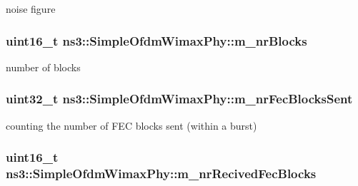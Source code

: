 noise figure 

\subsubsection[{\texorpdfstring{m\+\_\+nr\+Blocks}{m_nrBlocks}}]{\setlength{\rightskip}{0pt plus 5cm}uint16\+\_\+t ns3\+::\+Simple\+Ofdm\+Wimax\+Phy\+::m\+\_\+nr\+Blocks\hspace{0.3cm}{\ttfamily [private]}}\hypertarget{classns3_1_1SimpleOfdmWimaxPhy_a391e4fe297758baff33fac4790a9dc95}{}\label{classns3_1_1SimpleOfdmWimaxPhy_a391e4fe297758baff33fac4790a9dc95}


number of blocks 

\subsubsection[{\texorpdfstring{m\+\_\+nr\+Fec\+Blocks\+Sent}{m_nrFecBlocksSent}}]{\setlength{\rightskip}{0pt plus 5cm}uint32\+\_\+t ns3\+::\+Simple\+Ofdm\+Wimax\+Phy\+::m\+\_\+nr\+Fec\+Blocks\+Sent\hspace{0.3cm}{\ttfamily [private]}}\hypertarget{classns3_1_1SimpleOfdmWimaxPhy_afe15245d52625d1c993dc3ac7fde60ee}{}\label{classns3_1_1SimpleOfdmWimaxPhy_afe15245d52625d1c993dc3ac7fde60ee}


counting the number of F\+EC blocks sent (within a burst) 

\subsubsection[{\texorpdfstring{m\+\_\+nr\+Recived\+Fec\+Blocks}{m_nrRecivedFecBlocks}}]{\setlength{\rightskip}{0pt plus 5cm}uint16\+\_\+t ns3\+::\+Simple\+Ofdm\+Wimax\+Phy\+::m\+\_\+nr\+Recived\+Fec\+Blocks\hspace{0.3cm}{\ttfamily [private]}}\hypertarget{classns3_1_1SimpleOfdmWimaxPhy_a5f5e1bd7475a9cbb57bf56d30b91c651}{}\label{classns3_1_1SimpleOfdmWimaxPhy_a5f5e1bd7475a9cbb57bf56d30b91c651}


